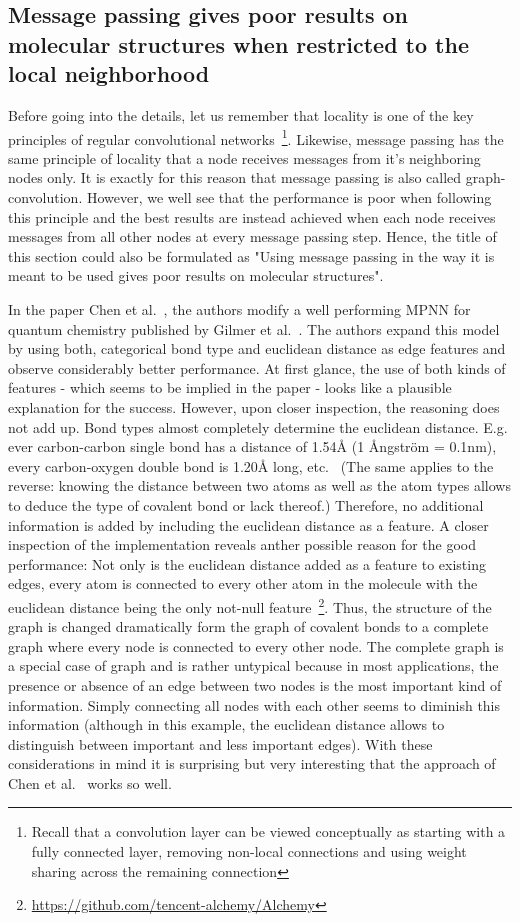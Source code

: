 \subsection{Message passing gives poor results on molecular structures when restricted to the local neighborhood}
\label{sec:neighborhood-expansion}

Before going into the details, let us remember that locality is one of the key principles of regular convolutional networks~\footnote{
	Recall that a convolution layer can be viewed conceptually as starting with a fully connected layer, removing non-local connections and using weight sharing across the remaining connection
}. Likewise, message passing has the same principle of locality that a node receives messages from it's neighboring nodes only. It is exactly for this reason that message passing is also called graph-convolution. However, we well see that the performance is poor when following this principle and the best results are instead achieved when each node receives messages from all other nodes at every message passing step. Hence, the title of this section could also be formulated as "Using message passing in the way it is meant to be used gives poor results on molecular structures".


In the paper Chen et al.~\cite{Chen2019}, the authors modify a well performing MPNN for quantum chemistry published by Gilmer et al.~\cite{Gilmer2017}. The authors expand this model by using both, categorical bond type and euclidean distance as edge features and observe considerably better performance. At first glance, the use of both kinds of features - which seems to be implied in the paper - looks like a plausible explanation for the success. However, upon closer inspection, the reasoning does not add up. Bond types almost completely determine the euclidean distance. E.g. ever carbon-carbon single bond has a distance of 1.54Å (1 Ångström = 0.1nm), every carbon-oxygen double bond is 1.20Å long, etc.~\cite{Organic-chemistry} (The same applies to the reverse: knowing the distance between two atoms as well as the atom types allows to deduce the type of covalent bond or lack thereof.) Therefore, no additional information is added by including the euclidean distance as a feature. A closer inspection of the implementation reveals anther possible reason for the good performance: Not only is the euclidean distance added as a feature to existing edges, every atom is connected to every other atom in the molecule with the euclidean distance being the only not-null feature~\footnote{\url{https://github.com/tencent-alchemy/Alchemy}}. Thus, the structure of the graph is changed dramatically form the graph of covalent bonds to a complete graph where every node is connected to every other node. The complete graph is a special case of graph and is rather untypical because in most applications, the presence or absence of an edge between two nodes is the most important kind of information. Simply connecting all nodes with each other seems to diminish this information (although in this example, the euclidean distance allows to distinguish between important and less important edges). With these considerations in mind it is surprising but very interesting that the approach of Chen et al.~\cite{Chen2019} works so well.

